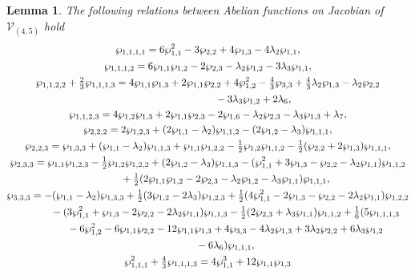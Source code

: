 \documentclass[pdftex]{sigma}
\numberwithin{equation}{section}
\newtheorem{Lemma}[Theorem]{Lemma}
\begin{document}
\begin{Lemma}\label{L:ind4WPC45}
The following relations between Abelian functions on Jacobian of $\mathcal{V}_{(4,5)}$ hold
\begin{gather*}
 \wp_{1,1,1,1} = 6 \wp_{1,1}^2 - 3\wp_{2,2} + 4\wp_{1,3} - 4 \lambda_2 \wp_{1,1}, \\
 \wp_{1,1,1,2} = 6\wp_{1,1}\wp_{1,2} - 2 \wp_{2,3} - \lambda_2 \wp_{1,2} - 3 \lambda_3 \wp_{1,1}, \\
 \wp_{1,1,2,2} + \tfrac{2}{3} \wp_{1,1,1,3} = 4\wp_{1,1}\wp_{1,3} + 2 \wp_{1,1} \wp_{2,2} + 4 \wp_{1,2}^2 - \tfrac{4}{3} \wp_{3,3} + \tfrac{4}{3} \lambda_2 \wp_{1,3} - \lambda_2 \wp_{2,2}\\
 \hphantom{\wp_{1,1,2,2} + \tfrac{2}{3} \wp_{1,1,1,3} =}{} - 3\lambda_3 \wp_{1,2} + 2\lambda_6, \\
 \wp_{1,1,2,3} = 4\wp_{1,2}\wp_{1,3} + 2\wp_{1,1}\wp_{2,3} - 2 \wp_{1,6} - \lambda_2 \wp_{2,3} - \lambda_3 \wp_{1,3} + \lambda_7, \\
 \wp_{2,2,2} = 2\wp_{1,2,3} + (2 \wp_{1,1}- \lambda_2) \wp_{1,1,2} - (2 \wp_{1,2} - \lambda_3 ) \wp_{1,1,1}, \\
 \wp_{2,2,3} = \wp_{1,3,3} + (\wp_{1,1} - \lambda_2)\wp_{1,1,3} + \wp_{1,1} \wp_{1,2,2} -\tfrac{1}{2} \wp_{1,2}\wp_{1,1,2} -\tfrac{1}{2} (\wp_{2,2} + 2\wp_{1,3}) \wp_{1,1,1}, \\
 \wp_{2,3,3} = \wp_{1,1} \wp_{1,2,3} - \tfrac{1}{2} \wp_{1,2} \wp_{1,2,2} + (2\wp_{1,2}-\lambda_3) \wp_{1,1,3} - (\wp_{1,1}^2 + 3\wp_{1,3} - \wp_{2,2} - \lambda_2 \wp_{1,1})\wp_{1,1,2} \\
 \hphantom{\wp_{2,3,3} =}{} +\tfrac{1}{2} (2\wp_{1,1}\wp_{1,2} - 2\wp_{2,3} -\lambda_2 \wp_{1,2} - \lambda_3 \wp_{1,1})\wp_{1,1,1},\\
 \wp_{3,3,3} = -(\wp_{1,1} - \lambda_2)\wp_{1,3,3} +\tfrac{1}{2} (3\wp_{1,2}-2\lambda_3) \wp_{1,2,3} + \tfrac{1}{2} (4\wp_{1,1}^2-2\wp_{1,3} -\wp_{2,2}-2\lambda_2\wp_{1,1})\wp_{1,2,2} \\
 \hphantom{\wp_{3,3,3} =}{} - (3\wp_{1,1}^2+\wp_{1,3}-2\wp_{2,2}-2\lambda_2 \wp_{1,1})\wp_{1,1,3} - \tfrac{1}{2}(2\wp_{2,3}+\lambda_3 \wp_{1,1}) \wp_{1,1,2} + \tfrac{1}{6}(5\wp_{1,1,1,3} \\
\hphantom{\wp_{3,3,3} =}{} - 6\wp_{1,2}^2 - 6\wp_{1,1} \wp_{2,2} - 12 \wp_{1,1} \wp_{1,3} + 4\wp_{3,3} - 4\lambda_2 \wp_{1,3} + 3\lambda_2 \wp_{2,2} + 6\lambda_3 \wp_{1,2}\\
\hphantom{\wp_{3,3,3} =}{} - 6\lambda_6)\wp_{1,1,1},\\
 \wp_{1,1,1}^2 + \tfrac{4}{3} \wp_{1,1,1,3} = 4\wp_{1,1}^3 + 12 \wp_{1,1} \wp_{1,3}

\end{gather*}
\end{Lemma}
\end{document}
